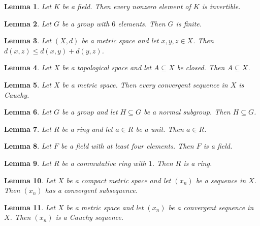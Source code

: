 \documentclass{article}
\newtheorem{lemma}{Lemma}
\begin{document}
\begin{lemma}\label{nonzero-invertible}
Let $K$ be a field. Then every nonzero element of $K$ is invertible.
\end{lemma}

\begin{lemma}\label{group-elements}
Let $G$ be a group with $6$ elements. Then $G$ is finite.
\end{lemma}

\begin{lemma}\label{metric-pair}
Let $(X,d)$ be a metric space and let $x,y,z\in X$. Then $d(x,z)\le d(x,y)+d(y,z)$.
\end{lemma}

\begin{lemma}\label{subset-of-space}
Let $X$ be a topological space and let $A\subseteq X$ be closed. Then $A\subseteq X$.
\end{lemma}

\begin{lemma}\label{convergent-cauchy}
Let $X$ be a metric space. Then every convergent sequence in $X$ is Cauchy.
\end{lemma}

\begin{lemma}\label{implicit-complement}
Let $G$ be a group and let $H\subseteq G$ be a normal subgroup. Then $H\subseteq G$.
\end{lemma}

\begin{lemma}\label{unit-in-ring}
Let $R$ be a ring and let $a\in R$ be a unit. Then $a\in R$.
\end{lemma}

\begin{lemma}\label{field-elements}
Let $F$ be a field with at least four elements. Then $F$ is a field.
\end{lemma}

\begin{lemma}\label{ring-with-one}
Let $R$ be a commutative ring with $1$. Then $R$ is a ring.
\end{lemma}

\begin{lemma}\label{compact-subsequence}
Let $X$ be a compact metric space and let $(x_n)$ be a sequence in $X$. Then $(x_n)$ has a convergent subsequence.
\end{lemma}

\begin{lemma}\label{cauchy-sequence}
Let $X$ be a metric space and let $(x_n)$ be a convergent sequence in $X$. Then $(x_n)$ is a Cauchy sequence.
\end{lemma}
\end{document}
